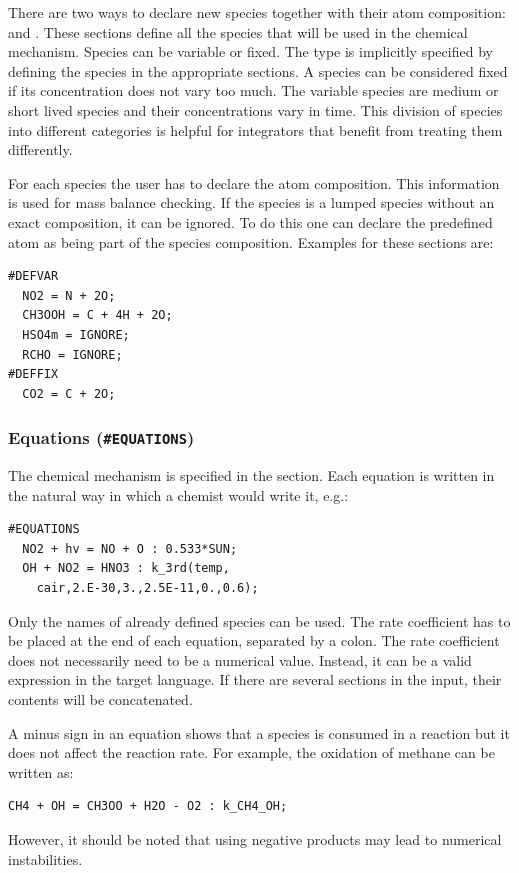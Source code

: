 \documentclass[twoside]{article}
\begin{document}
There are two ways to declare new species together with their atom
composition:  and . These sections define
all the species that will be used in the chemical mechanism. Species can
be variable or fixed. The type is implicitly specified by defining the
species in the appropriate sections. A species can be considered fixed
if its concentration does not vary too much. The variable species are
medium or short lived species and their concentrations vary in time.
This division of species into different categories is helpful for
integrators that benefit from treating them differently.

For each species the user has to declare the atom composition. This
information is used for mass balance checking. If the species is a
lumped species without an exact composition, it can be ignored. To do
this one can declare the predefined atom  as being part of
the species composition. Examples for these sections are:
%
\begin{verbatim}
#DEFVAR
  NO2 = N + 2O;
  CH3OOH = C + 4H + 2O;
  HSO4m = IGNORE;
  RCHO = IGNORE;
#DEFFIX
  CO2 = C + 2O;
\end{verbatim}

\subsubsection{Equations ({\tt\#EQUATIONS})}
\label{sec:section-equations}

The chemical mechanism is specified in the  section.
Each equation is written in the natural way in which a chemist would
write it, e.g.:
%
\begin{verbatim}
#EQUATIONS
  NO2 + hv = NO + O : 0.533*SUN;
  OH + NO2 = HNO3 : k_3rd(temp,
    cair,2.E-30,3.,2.5E-11,0.,0.6);
\end{verbatim}
%
Only the names of already defined species can be used. The rate
coefficient has to be placed at the end of each equation, separated by a
colon. The rate coefficient does not necessarily need to be a numerical
value. Instead, it can be a valid expression in the target language. If
there are several  sections in the input, their
contents will be concatenated. 

A minus sign in an equation shows that a species is consumed in a
reaction but it does not affect the reaction rate. For example, the
oxidation of methane can be written as:
%
\begin{verbatim}
CH4 + OH = CH3OO + H2O - O2 : k_CH4_OH;
\end{verbatim}
%
However, it should be noted that using negative products may lead to
numerical instabilities.
\end{document}
